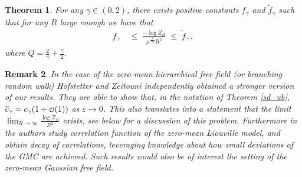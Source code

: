 \documentclass[11pt]{article}
\newcommand\smallO{
  \mathchoice
    {{\scriptstyle\mathcal{O}}}%
    {{\scriptstyle\mathcal{O}}}%
    {{\scriptscriptstyle\mathcal{O}}}%
    {\scalebox{.7}{$\scriptscriptstyle\mathcal{O}$}}%
  }
\numberwithin{equation}{section}
\newtheorem{theorem}{Theorem}[section]
\newtheorem{remark}[theorem]{Remark}
\theoremstyle{definition}
\renewcommand{\tilde}{\widetilde}          %
\renewcommand{\leq}{\;\leqslant\;}                   %
\begin{document}
\begin{theorem}\label{fe_bounds}
For any $\gamma \in (0,2)$, there exists positive constants $f_\gamma$ and $\tilde f_\gamma$ such that for any $R$ large enough we have that
\begin{align*}
  f_\gamma & \leq \frac{- \log Z_R}{ \mu^{\frac{2}{\gamma Q}} R^2} \leq \tilde f_\gamma\,,
\end{align*}
where $Q = \frac{2}{\gamma} + \frac{\gamma}{2}$.
\end{theorem}
\noindent 
\begin{remark}
In the case of the zero-mean hierarchical free field (or branching random walk) Hofstetter and Zeitouni \cite[Theorem 1.5]{HZ} independently obtained a stronger version of our results. 
They are able to show that, in the notation of Theorem \ref{sd_ub},  $\tilde{c}_{\gamma}=c_{\gamma}(1+\smallO(1))$ as $\varepsilon \to 0$. This also translates into a statement that the limit 
$\lim_{R\to \infty} \frac{\log Z_{R}}{R^2}$ exists, see below for a discussion of this problem. Furthermore in \cite{HZ} the authors study correlation function of the zero-mean Liouville model, and obtain decay of correlations, leveraging knowledge about how small deviations of the GMC are achieved.  
Such results would also be of interest the setting of the zero-mean Gaussian free field.  
\end{remark}
\end{document}

